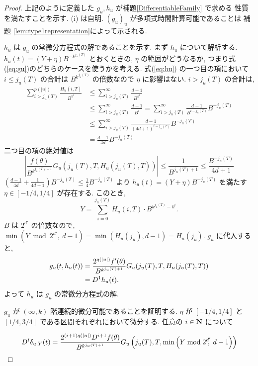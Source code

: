 \begin{proof}
 上記のように定義した $g_u, h_u$ が補題\ref{DifferentiableFamily} で求める
 性質を満たすことを示す. (i) は自明. 
 $(g_u)_u$ が多項式時間計算可能であることは
  補題 \ref{lem:type1representation}によって示される.

 $h_u$ は $g_u$ の常微分方程式の解であることを示す.
 まず $h_u$ について解析する. 
  $h_u(t) = (Y + \eta) B^{-k^{j_u(T)}}$ とおくときの, $\eta$ の範囲がどうなるか,
  つまり式(\ref{eq:gu})のどちらのケースを使うかを考える.
  式(\ref{eq:hu}) の一つ目の項において
 $i \le j_u(T)$ の合計は $B^{k^{j_u(T)}}$ の倍数なので $\eta$ に影響はない.
  $i > j_u(T)$ の合計は, 
 \begin{align*}
  \sum_{i>j_u(T)}^{p(|u|)} \frac{H_u(i, T)}{B^{k^i}} 
  & \le \sum_{i>j_u(T)}^\infty \frac{d-1}{B^{k^i}}  \\
  & \le \sum_{i>j_u(T)}^\infty \frac{d-1}{B^i} 
   = \sum_{i>j_u(T)}^\infty \frac{d-1}{B^{i-j_u(T)}}B^{-j_u(T)} \\
  & \le \sum_{i>j_u(T)}^\infty \frac{d-1}{(4d+1)^{i-j_u(T)}}B^{-j_u(T)} \\
  & = \frac{d-1}{4d}B^{-j_u(T)}
 \end{align*}
 二つ目の項の絶対値は
 \begin{equation}
  \left| \frac{f(\theta)}{B^{k^{j_u(T)+1}}} G_u(j_u(T), T, H_u(j_u(T), T)) \right|
  \le \frac{1}{B^{j_u(T)+1}}
  \le \frac{B^{-j_u(T)}}{4d+1}
 \end{equation}
 $(\frac{d-1}{4d} + \frac{1}{4d+1})B^{-j_u(T)} \le \frac 1 4 B^{-j_u(T)} $
  より $h_u(t) = (Y + \eta) B^{-j_u(T)}$ を満たす $\eta \in [-1/4, 1/4]$
 が存在する. このとき,
 \begin{equation}
  Y = \sum_{i=0}^{j_u(T)}H_u(i, T) \cdot B^{k^{j_u(T)} - k^i} .
 \end{equation}
 $B$ は $2^{d'}$ の倍数なので, 
 $\min (Y \bmod 2^{d'}\!\!\!,\ d-1) = \min (H_u(j_u), d-1) = H_u(j_u)$. 
 $g_u$ に代入すると,
 \begin{align*}
   g_u(t, h_u(t)) 
  & =  \frac{2^{q(|u|)} f'(\theta)}{B^{k^{j_u(T)+1}}}
   G_u(j_u(T), T, H_u(j_u(T), T)) \\
  & =  D^{1}h_u(t).
 \end{align*}
 よって $h_u$ は $g_u$ の常微分方程式の解.

  $g_u$ が $(\infty, k)$ 階連続的微分可能であることを証明する.
  $\eta$ が $[-1/4, 1/4]$ と $[1/4, 3/4]$ である区間それぞれにおいて微分する.
  任意の $i \in \mathbf N$ について

  \begin{equation}
   D^i \delta_{u,Y}(t) 
    = \frac{2^{(i+1)q(|u|)} D^{i+1}f(\theta)}{B^{k^{j_u(T)+1}}}
    G_u\left( j_u(T), T, \min \left(Y \bmod 2^{d'}\!\!\!,\ d-1 \right) \right)
  \end{equation}


\end{proof}
